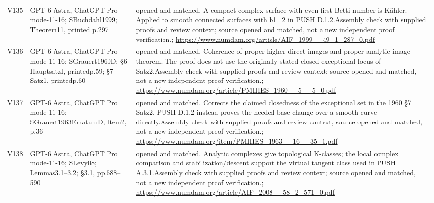 \documentclass[11pt,a4paper]{article}
\theoremstyle{plain}
\theoremstyle{definition}
\begin{document}
\begin{longtable}{@{}L{.08\linewidth}L{.31\linewidth}L{.56\linewidth}@{}}
V135 & GPT-6 Astra, ChatGPT Pro mode-11-16; S\newline Buchdahl1999; Theorem11, printed p.297 & opened and matched. A compact complex surface with even first Betti number is Kähler. Applied to smooth connected surfaces with b1=2 in PUSH D.1.2.\newline Assembly check with supplied proofs and review context; source opened and matched, not a new independent proof verification.\newline {}; \url{https://www.numdam.org/article/AIF_1999__49_1_287_0.pdf}\\
V136 & GPT-6 Astra, ChatGPT Pro mode-11-16; S\newline Grauert1960D; §6 HauptsatzI, printedp.59; §7 Satz1, printedp.60 & opened and matched. Coherence of proper higher direct images and proper analytic image theorem. The proof does not use the originally stated closed exceptional locus of Satz2.\newline Assembly check with supplied proofs and review context; source opened and matched, not a new independent proof verification.\newline {}; \url{https://www.numdam.org/article/PMIHES_1960__5__5_0.pdf}\\
V137 & GPT-6 Astra, ChatGPT Pro mode-11-16; S\newline Grauert1963ErratumD; Item2, p.36 & opened and matched. Corrects the claimed closedness of the exceptional set in the 1960 §7 Satz2. PUSH D.1.2 instead proves the needed base change over a smooth curve directly.\newline Assembly check with supplied proofs and review context; source opened and matched, not a new independent proof verification.\newline {}; \url{https://www.numdam.org/item/PMIHES_1963__16__35_0.pdf}\\
V138 & GPT-6 Astra, ChatGPT Pro mode-11-16; S\newline Levy08; Lemmas3.1--3.2; §3.1, pp.588--590 & opened and matched. Analytic complexes give topological K-classes; the local complex comparison and stabilization/\allowbreak{}descent support the virtual tangent class used in PUSH A.3.1.\newline Assembly check with supplied proofs and review context; source opened and matched, not a new independent proof verification.\newline {}; \url{https://www.numdam.org/article/AIF_2008__58_2_571_0.pdf}\\

\end{longtable}
\end{document}
